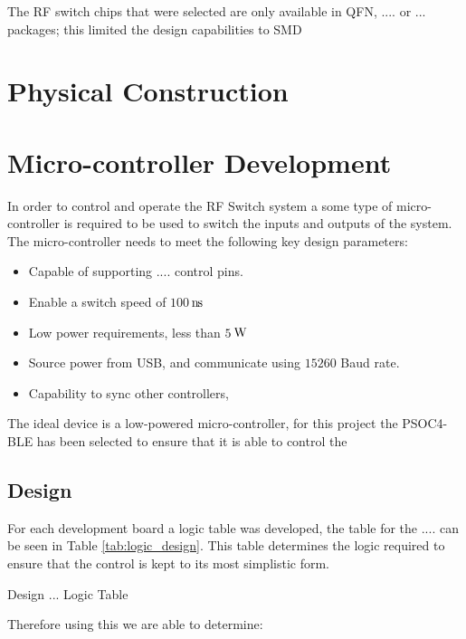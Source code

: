\documentclass[12pt,openany,a4paper]{book}
\newcommand{\pack}	{\hspace{-0.08em}}
\newcommand{\ns}	{\ensuremath{\rm\,n\pack s}}
\newcommand{\W}		{\ensuremath{\rm\,W}}
\begin{document}
The RF switch chips that were selected are only available in QFN, .... or ... packages; this limited the design capabilities to SMD




\section{Physical Construction}








\section{Micro-controller Development}		\label{sec:micro_dev}
In order to control and operate the RF Switch system a some type of micro-controller is required to be used to switch the inputs and outputs of the system. The micro-controller needs to meet the following key design parameters:
\begin{itemize}
	\setlength\itemsep{-0.5em}
	\item Capable of supporting .... control pins.
	\item Enable a switch speed of $100$\ns
	\item Low power requirements, less than $5$\W
	\item Source power from USB, and communicate using $15260$ Baud rate.
	\item Capability to sync other controllers, 
\end{itemize}
The ideal device is a low-powered micro-controller, for this project the PSOC4-BLE has been selected to ensure that it is able to control the 


\subsection{Design}



For each development board a logic table was developed, the table for the .... can be seen in Table \ref{tab:logic_design}. This table determines the logic required to ensure that the control is kept to its most simplistic form.
\begin{table}
	\centering
	\caption{Design ... Logic Table}
	\label{tab:logic_design}
\end{table}
Therefore using this we are able to determine:
\end{document}
